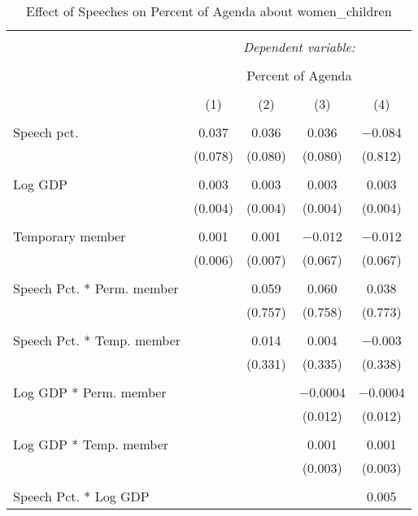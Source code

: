 
\begin{table}[!htbp] \centering 
  \caption{Effect of Speeches on Percent of Agenda about  women_children} 
  \label{} 
\begin{tabular}{@{\extracolsep{5pt}}lcccc} 
\\[-1.8ex]\hline 
\hline \\[-1.8ex] 
 & \multicolumn{4}{c}{\textit{Dependent variable:}} \\ 
\cline{2-5} 
\\[-1.8ex] & \multicolumn{4}{c}{Percent of Agenda} \\ 
\\[-1.8ex] & (1) & (2) & (3) & (4)\\ 
\hline \\[-1.8ex] 
 Speech pct. & 0.037 & 0.036 & 0.036 & $-$0.084 \\ 
  & (0.078) & (0.080) & (0.080) & (0.812) \\ 
  & & & & \\ 
 Log GDP & 0.003 & 0.003 & 0.003 & 0.003 \\ 
  & (0.004) & (0.004) & (0.004) & (0.004) \\ 
  & & & & \\ 
 Temporary member & 0.001 & 0.001 & $-$0.012 & $-$0.012 \\ 
  & (0.006) & (0.007) & (0.067) & (0.067) \\ 
  & & & & \\ 
 Speech Pct. * Perm. member &  & 0.059 & 0.060 & 0.038 \\ 
  &  & (0.757) & (0.758) & (0.773) \\ 
  & & & & \\ 
 Speech Pct. * Temp. member &  & 0.014 & 0.004 & $-$0.003 \\ 
  &  & (0.331) & (0.335) & (0.338) \\ 
  & & & & \\ 
 Log GDP * Perm. member &  &  & $-$0.0004 & $-$0.0004 \\ 
  &  &  & (0.012) & (0.012) \\ 
  & & & & \\ 
 Log GDP * Temp. member &  &  & 0.001 & 0.001 \\ 
  &  &  & (0.003) & (0.003) \\ 
  & & & & \\ 
 Speech Pct. * Log GDP &  &  &  & 0.005 \\ 

\end{tabular}
\end{table}
